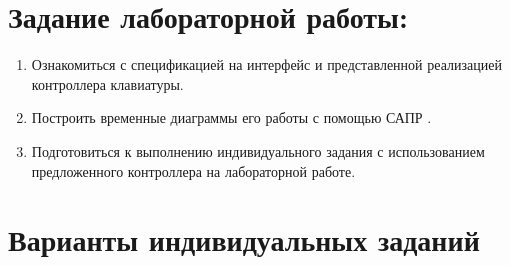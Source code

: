 




\section{Задание лабораторной работы:}
\begin{enumerate}[noitemsep,topsep=0pt, after=\vspace{2pt}]

\item{Ознакомиться с спецификацией на интерфейс  и представленной реализацией контроллера клавиатуры.}

\item{Построить временные диаграммы его работы с помощью САПР .}

\item{Подготовиться к выполнению индивидуального задания с использованием предложенного контроллера на лабораторной работе.}

\end{enumerate}





\section{Варианты индивидуальных заданий}


